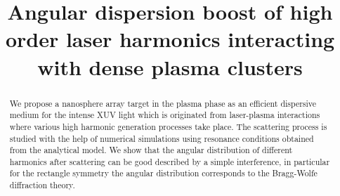 \documentclass[conference]{IEEEtran}
\begin{document}
\renewcommand*{\figureautorefname}{Fig.}
\renewcommand*{\equationautorefname}{Eq.}






\title{Angular dispersion boost of high order laser harmonics interacting with dense
plasma clusters}

\author{
}


\maketitle

\begin{abstract}
	 We propose a nanosphere array target in the plasma phase as an efficient dispersive medium for the intense XUV light which is originated from laser-plasma interactions where various high harmonic generation processes take place. The scattering process is studied with the help of numerical simulations using resonance conditions obtained from the analytical model. We show that the angular distribution of different harmonics after scattering can be good described by a simple interference, in particular for the rectangle symmetry the angular distribution corresponds to the Bragg-Wolfe diffraction theory.
\end{abstract}


~\\

\end{document}
